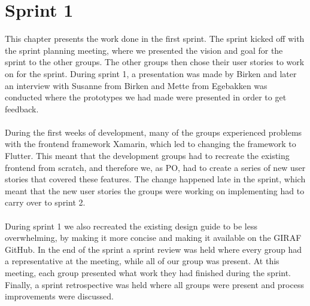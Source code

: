 \chapter{Sprint 1}
This chapter presents the work done in the first sprint.
The sprint kicked off with the sprint planning meeting, where we presented the vision and goal for the sprint to the other groups.
The other groups then chose their user stories to work on for the sprint.
During sprint 1, a presentation was made by Birken and later an interview with Susanne from Birken and Mette from Egebakken was conducted where the prototypes we had made were presented in order to get feedback.
\\\\
During the first weeks of development, many of the groups experienced problems with the frontend framework Xamarin, which led to changing the framework to Flutter.
This meant that the development groups had to recreate the existing frontend from scratch, and therefore we, as PO, had to create a series of new user stories that covered these features.
The change happened late in the sprint, which meant that the new user stories the groups were working on implementing had to carry over to sprint 2.
\\\\
During sprint 1 we also recreated the existing design guide to be less overwhelming, by making it more concise and making it available on the GIRAF GitHub.
In the end of the sprint a sprint review was held where every group had a representative at the meeting, while all of our group was present.
At this meeting, each group presented what work they had finished during the sprint.
Finally, a sprint retrospective was held where all groups were present and process improvements were discussed.
